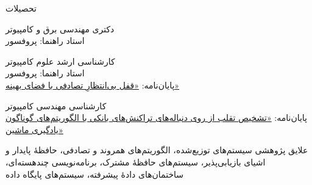 \documentclass[11pt]{article}
\begin{document}

\begin{faSection}{تحصیلات}

دکتری مهندسی برق و کامپیوتر\\
استاد راهنما: پروفسور 

\vspace{0.5em}
کارشناسی ارشد علوم کامپیوتر\\
استاد راهنما: پروفسور \\
پایان‌نامه: \href{https://ucalgary.scholaris.ca/bitstreams/5ae5cf8f-5009-4db3-b91e-d3dbb679b5bf/download}{«قفل بی‌انتظارِ تصادفی با فضای بهینه»}

\vspace{0.5em}
کارشناسی مهندسی کامپیوتر\\
پایان‌نامه: \href{https://github.com/kahbodaeini/Fraud-Detection}{«تشخیص تقلب از روی دنباله‌های تراکنش‌های بانکی با الگوریتم‌های گوناگون یادگیری ماشین»}

\end{faSection}

\begin{faSection}{علایق پژوهشی}
سیستم‌های توزیع‌شده، الگوریتم‌های همروند و تصادفی، حافظۀ پایدار و اشیای بازیابی‌پذیر،
سیستم‌های حافظۀ مشترک، برنامه‌نویسی چندهسته‌ای، ساختمان‌های دادۀ پیشرفته، سیستم‌های پایگاه داده
\end{faSection}
\end{document}
